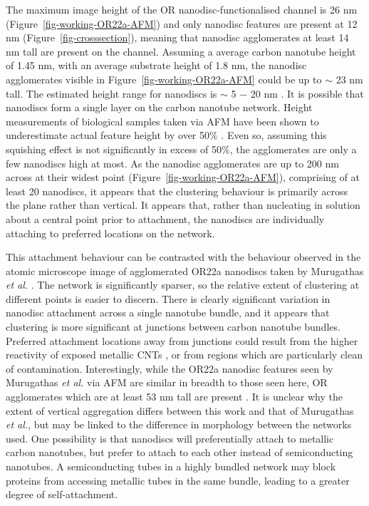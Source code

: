 \documentclass[
  a4paper,
]{scrbook}
\begin{document}
The maximum image height of the OR nanodisc-functionalised channel is 26
nm (Figure~\ref{fig-working-OR22a-AFM}) and only nanodisc features are
present at 12 nm (Figure~\ref{fig-crosssection}), meaning that nanodisc
agglomerates at least 14 nm tall are present on the channel. Assuming a
average carbon nanotube height of 1.45 nm, with an average substrate
height of 1.8 nm, the nanodisc agglomerates visible in
Figure~\ref{fig-working-OR22a-AFM} could be up to \(\sim\) 23 nm tall.
The estimated height range for nanodiscs is \(\sim\) 5 \(-\) 20 nm
\autocite{Nath2007,Bayburt2010,Murugathas2020,Cheema2021}. It is
possible that nanodiscs form a single layer on the carbon nanotube
network. Height measurements of biological samples taken via AFM have
been shown to underestimate actual feature height by over 50\%
\autocite{Vobornik2023}. Even so, assuming this squishing effect is not
significantly in excess of 50\%, the agglomerates are only a few
nanodiscs high at most. As the nanodisc agglomerates are up to 200 nm
across at their widest point (Figure~\ref{fig-working-OR22a-AFM}),
comprising of at least 20 nanodiscs, it appears that the clustering
behaviour is primarily across the plane rather than vertical. It appears
that, rather than nucleating in solution about a central point prior to
attachment, the nanodiscs are individually attaching to preferred
locations on the network.

This attachment behaviour can be contrasted with the behaviour observed
in the atomic microscope image of agglomerated OR22a nanodiscs taken by
Murugathas \emph{et al.} \autocite{Murugathas2019b}. The network is
significantly sparser, so the relative extent of clustering at different
points is easier to discern. There is clearly significant variation in
nanodisc attachment across a single nanotube bundle, and it appears that
clustering is more significant at junctions between carbon nanotube
bundles. Preferred attachment locations away from junctions could result
from the higher reactivity of exposed metallic CNTs \autocite{Cao2009},
or from regions which are particularly clean of contamination.
Interestingly, while the OR22a nanodisc features seen by Murugathas
\emph{et al.} via AFM are similar in breadth to those seen here, OR
agglomerates which are at least 53 nm tall are present
\autocite{Murugathas2020}. It is unclear why the extent of vertical
aggregation differs between this work and that of Murugathas \emph{et
al.}, but may be linked to the difference in morphology between the
networks used. One possibility is that nanodiscs will preferentially
attach to metallic carbon nanotubes, but prefer to attach to each other
instead of semiconducting nanotubes. A semiconducting tubes in a highly
bundled network may block proteins from accessing metallic tubes in the
same bundle, leading to a greater degree of self-attachment.
\end{document}
